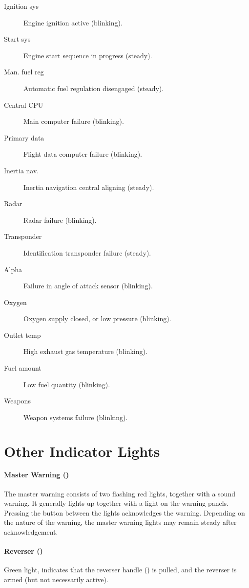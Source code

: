 \documentclass[a4paper]{report}
\begin{document}
\begin{description}
  \item[Ignition sys] Engine ignition active (blinking).
  \item[Start sys] Engine start sequence in progress (steady).
  \item[Man. fuel reg] Automatic fuel regulation disengaged (steady).
  \item[Central CPU] Main computer failure (blinking).
  \item[Primary data] Flight data computer failure (blinking).
  \item[Inertia nav.] Inertia navigation central aligning (steady).
  \item[Radar] Radar failure (blinking).
  \item[Transponder] Identification transponder failure (steady).
  \item[Alpha] Failure in angle of attack sensor (blinking).
  \item[Oxygen] Oxygen supply closed, or low pressure (blinking).
  \item[Outlet temp] High exhaust gas temperature (blinking).
  \item[Fuel amount] Low fuel quantity (blinking).
  \item[Weapons] Weapon systems failure (blinking).
\end{description}

\section{Other Indicator Lights}
\paragraph{Master Warning ()}
The master warning consists of two flashing red lights, together with a sound warning.
It generally lights up together with a light on the warning panels.
Pressing the button between the lights acknowledges the warning.
Depending on the nature of the warning,
the master warning lights may remain steady after acknowledgement.

\paragraph{Reverser ()}
Green light, indicates that the reverser handle
() is pulled,
and the reverser is armed (but not necessarily active).
\end{document}

